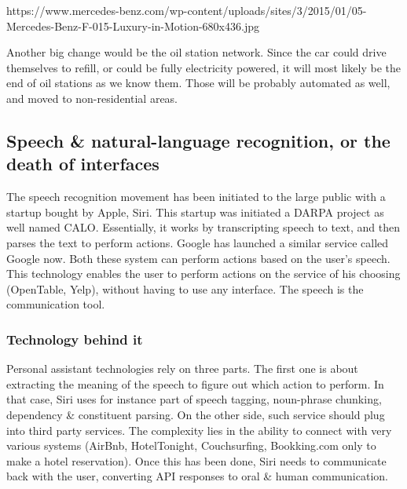 \documentclass[12pt]{article}
\begin{document}
https://www.mercedes-benz.com/wp-content/uploads/sites/3/2015/01/05-Mercedes-Benz-F-015-Luxury-in-Motion-680x436.jpg 

Another big change would be the oil station network. Since the car could drive themselves to refill, or could be fully electricity powered, it will most likely be the end of oil stations as we know them. Those will be probably automated as well, and moved to non-residential areas. 



\subsection{Speech & natural-language recognition, or the death of interfaces}

The speech recognition movement has been initiated to the large public with a startup bought by Apple, Siri. This startup was initiated a DARPA project as well named CALO. Essentially, it works by transcripting speech to text, and then parses the text to perform actions. Google has launched a similar service called Google now. Both these system can perform actions based on the user's speech. 
This technology enables the user to perform actions on the service of his choosing (OpenTable, Yelp), without having to use any interface. The speech is the communication tool.

\subsubsection{Technology behind it }
Personal assistant technologies rely on three parts. 
The first one is about extracting the meaning of the speech to figure out which action to perform. In that case, Siri uses for instance part of speech tagging, noun-phrase chunking, dependency & constituent parsing. 
On the other side, such service should plug into third party services. The complexity lies in the ability to connect with very various systems (AirBnb, HotelTonight, Couchsurfing, Bookking.com only to make a hotel reservation). 
Once this has been done, Siri needs to communicate back with the user, converting API responses to oral & human communication. 
\end{document}
